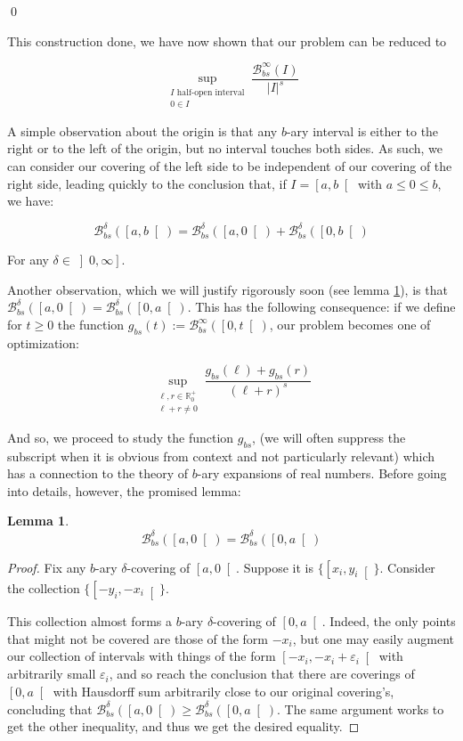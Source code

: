\documentclass[11pt]{amsart}
\newcommand{\R}{\mathbb{R}}
\newcommand{\BB}{\mathcal{B}}
\newtheorem{lemma}{Lemma}
\begin{document}
\qed

This construction done, we have now shown that our problem can be reduced to


\[\sup_{\substack{\text{$I$ half-open interval}\\ 0 \in I}} \frac{\BB_{bs}^\infty(I)}{\lvert I \rvert^s}\]

A simple observation about the origin is that any $b$-ary interval is either to the right or to the left of the origin, but no interval touches both sides. As such, we can consider our covering of the left side to be independent of our covering of the right side, leading quickly to the conclusion that, if $I = \left[ a, b \right[$ with $a \leq 0 \leq b$, we have:

\[\BB_{bs}^\delta(\left[a, b\right[) = \BB_{bs}^\delta(\left[a, 0\right[) + \BB_{bs}^\delta(\left[0, b\right[)\]

For any $\delta \in \left]0, \infty \right]$.

Another observation, which we will justify rigorously soon (see lemma \ref{sidedoesntmatter}), is that $\BB_{bs}^\delta(\left[a, 0\right[) = \BB_{bs}^\delta(\left[0, a\right[)$. This has the following consequence: if we define for $t \geq 0$ the function $g_{bs}(t) := \BB_{bs}^\infty(\left[0, t \right[)$, our problem becomes one of optimization:

\[ \sup_{\substack{\ell,r \in \R^+_0\\\ell+r \neq 0}} \frac{g_{bs}(\ell) + g_{bs}(r)}{(\ell + r)^s} \]

And so, we proceed to study the function $g_{bs}$, (we will often suppress the subscript when it is obvious from context and not particularly relevant) which has a connection to the theory of $b$-ary expansions of real numbers. Before going into details, however, the promised lemma:

\begin{lemma} \label{sidedoesntmatter}
\[\BB_{bs}^\delta(\left[a, 0\right[) = \BB_{bs}^\delta(\left[0, a\right[)\]
\end{lemma}

\begin{proof}
Fix any $b$-ary $\delta$-covering of $\left[a, 0\right[$. Suppose it is $\{\left[x_i, y_i\right[\}$. Consider the collection $\{\left[-y_i, -x_i\right[\}$. 

This collection almost forms a $b$-ary $\delta$-covering of $\left[0, a\right[$. Indeed, the only points that might not be covered are those of the form $-x_i$, but one may easily augment our collection of intervals with things of the form $\left[ -x_i, -x_i + \varepsilon_i \right[$ with arbitrarily small $\varepsilon_i$, and so reach the conclusion that there are coverings of $\left[0, a\right[$ with Hausdorff sum arbitrarily close to our original covering's, concluding that $\BB_{bs}^\delta(\left[a, 0\right[) \geq \BB_{bs}^\delta(\left[0, a\right[)$. The same argument works to get the other inequality, and thus we get the desired equality.
\end{proof}
\end{document}

